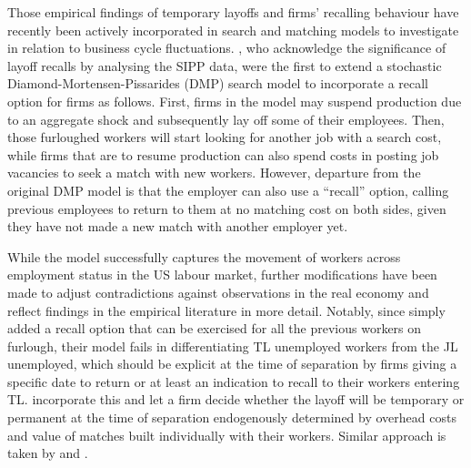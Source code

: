 \documentclass[a4paper, 11pt, tikz]{article}
\begin{document}
Those empirical findings of temporary layoffs and firms' recalling behaviour have recently been actively incorporated in search and matching models to investigate in relation to business cycle fluctuations.
\cite{fujita2017recall}, who acknowledge the significance of layoff recalls by analysing the SIPP data, were the first to extend a stochastic Diamond-Mortensen-Pissarides (DMP) search model to incorporate a recall option for firms as follows.
First, firms in the model may suspend production due to an aggregate shock and subsequently lay off some of their employees.
Then, those furloughed workers will start looking for another job with a search cost, while firms that are to resume production can also spend costs in posting job vacancies to seek a match with new workers.
However, departure from the original DMP model is that the employer can also use a ``recall'' option, calling previous employees to return to them at no matching cost on both sides, given they have not made a new match with another employer yet.

While the \cite{fujita2017recall} model successfully captures the movement of workers across employment status in the US labour market, further modifications have been made to adjust contradictions against observations in the real economy and reflect findings in the empirical literature in more detail.
Notably, since \cite{fujita2017recall} simply added a recall option that can be exercised for all the previous workers on furlough, their model fails in differentiating TL unemployed workers from the JL unemployed, which should be explicit at the time of separation by firms giving a specific date to return or at least an indication to recall to their workers entering TL.
\cite{gertler2022temporary} incorporate this and let a firm decide whether the layoff will be temporary or permanent at the time of separation endogenously determined by overhead costs and value of matches built individually with their workers.
Similar approach is taken by \cite{gallant2020temporary} and \cite{komatsu2024temporary}.
\end{document}
